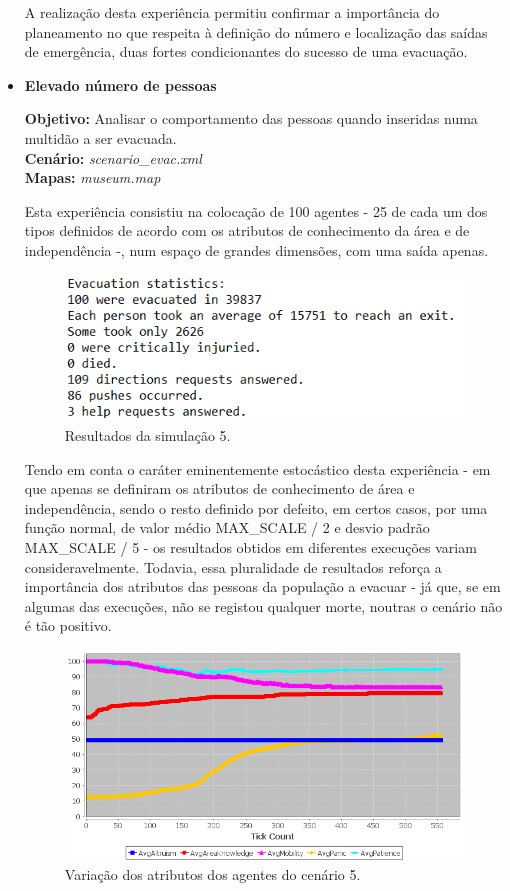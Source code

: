 \documentclass[12pt]{article}
\begin{document}
\begin{titlepage}
\begin{itemize}
A realização desta experiência permitiu confirmar a importância do planeamento no que respeita à definição do número e localização das saídas de emergência, duas fortes condicionantes do sucesso de uma evacuação.


\item \textbf{Elevado número de pessoas}

\textbf{Objetivo:} 
Analisar o comportamento das pessoas quando inseridas numa multidão a ser evacuada.
\\\textbf{Cenário:} 
\textit{scenario\_evac.xml}
\\\textbf{Mapas:} 
\textit{museum.map}
\newline

Esta experiência consistiu na colocação de 100 agentes - 25 de cada um dos tipos definidos de acordo com os atributos de conhecimento da área e de independência -, num espaço de grandes dimensões, com uma saída apenas.

\begin{figure}[H]
	\centering
	\includegraphics{log_sc5.png}
	\caption{Resultados da simulação 5.}
	\label{log_sc5}
\end{figure}

Tendo em conta o caráter eminentemente estocástico desta experiência - em que apenas se definiram os atributos de conhecimento de área e independência, sendo o resto definido por defeito, em certos casos, por uma função normal, de valor médio MAX\_SCALE / 2 e desvio padrão MAX\_SCALE / 5 - os resultados obtidos em diferentes execuções variam consideravelmente.
Todavia, essa pluralidade de resultados reforça a importância dos atributos das pessoas da população a evacuar - já que, se em algumas das execuções, não se registou qualquer morte, noutras o cenário não é tão positivo.

\begin{figure}[H]
	\centering
	\includegraphics{graph_sc5_1.png}
	\caption{Variação dos atributos dos agentes do cenário 5.}
	\label{graph_sc5}
\end{figure}


\end{itemize}
\end{titlepage}
\end{document}
